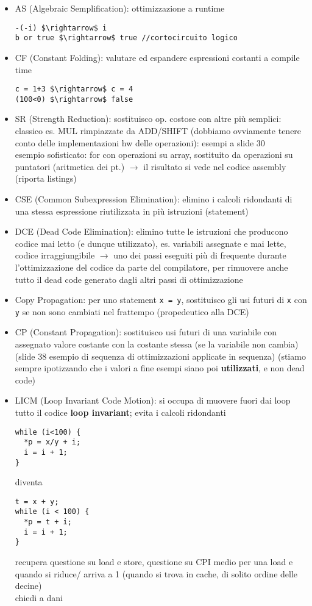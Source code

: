 \begin{itemize}
  \item AS (Algebraic Semplification): ottimizzazione a runtime
  \begin{lstlisting}
-(-i) $\rightarrow$ i
b or true $\rightarrow$ true //cortocircuito logico\end{lstlisting}
  \item CF (Constant Folding):  valutare ed espandere espressioni costanti a compile time
  \begin{lstlisting}
c = 1+3 $\rightarrow$ c = 4
(100<0) $\rightarrow$ false\end{lstlisting}
  
  \item SR (Strength Reduction): sostituisco op. costose con altre pi\`u semplici: classico es. MUL rimpiazzate da ADD/SHIFT (dobbiamo ovviamente tenere conto delle implementazioni hw delle operazioni): esempi a slide 30\\
  esempio sofisticato: for con operazioni su array, sostituito da operazioni su puntatori (aritmetica dei pt.) $\rightarrow$ il risultato si vede nel codice assembly (riporta listings)
\item CSE (Common Subexpression Elimination): elimino i calcoli ridondanti di una stessa espressione riutilizzata in pi\`u istruzioni (statement)
\item DCE (Dead Code Elimination): elimino tutte le istruzioni che producono codice mai letto (e dunque utilizzato), es. variabili assegnate e mai lette, codice irraggiungibile $\rightarrow$ uno dei passi eseguiti pi\`u di frequente durante l'ottimizzazione del codice da parte del compilatore, per rimuovere anche tutto il dead code generato dagli altri passi di ottimizzazione
\item Copy Propagation: per uno statement \lstinline|x = y|, sostituisco gli usi futuri di \lstinline|x| con \lstinline|y| se non sono cambiati nel frattempo (propedeutico alla DCE)
\item CP (Constant Propagation): sostituisco usi futuri di una variabile con assegnato valore costante con la costante stessa (se la variabile non cambia) (slide 38 esempio di sequenza di ottimizzazioni applicate in sequenza) (stiamo sempre ipotizzando che i valori a fine esempi siano poi \textbf{utilizzati}, e non dead code)
\item LICM (Loop Invariant Code Motion): si occupa di muovere fuori dai loop tutto il codice \textbf{loop invariant}; evita i calcoli ridondanti\\
\begin{lstlisting}
while (i<100) {
  *p = x/y + i;
  i = i + 1;
}
\end{lstlisting}
diventa
\begin{lstlisting}
t = x + y;
while (i < 100) {
  *p = t + i;
  i = i + 1;
}
\end{lstlisting}
recupera questione su load e store, questione su CPI medio per una load e quando si riduce/ arriva a 1 (quando si trova in cache, di solito ordine delle decine)\\
chiedi a dani

\end{itemize}

